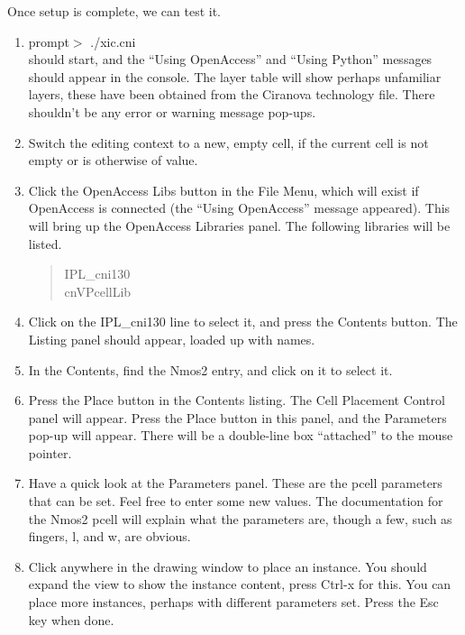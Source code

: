 Once setup is complete, we can test it.
\begin{enumerate}
\item{{\vt prompt$>$  ./xic.cni}\\
{\Xic} should start, and the ``Using OpenAccess'' and ``Using Python''
messages should appear in the console.  The layer table will show
perhaps unfamiliar layers, these have been obtained from the Ciranova
technology file.  There shouldn't be any error or warning message
pop-ups.}

\item{Switch the editing context to a new, empty cell, if the current
cell is not empty or is otherwise of value.}

\item{Click the {\cb OpenAccess Libs} button in the {\cb File Menu},
which will exist if OpenAccess is connected (the ``Using OpenAccess''
message appeared).  This will bring up the {\cb OpenAccess Libraries}
panel.  The following libraries will be listed.
\begin{quote}\vt
IPL\_cni130\\
cnVPcellLib
\end{quote} }

\item{Click on the {\vt IPL\_cni130} line to select it, and press the
{\cb Contents} button.  The {\cb Listing} panel should appear, loaded
up with names.}

\item{In the {\cb Contents}, find the {\et Nmos2} entry, and click on
it to select it.}

\item{Press the {\cb Place} button in the {\cb Contents} listing.  The
{\cb Cell Placement Control} panel will appear.  Press the {\cb Place}
button in this panel, and the {\cb Parameters} pop-up will appear. 
There will be a double-line box ``attached'' to the mouse pointer.}

\item{Have a quick look at the {\cb Parameters} panel.  These are the
pcell parameters that can be set.  Feel free to enter some new values. 
The documentation for the {\vt Nmos2} pcell will explain what the
parameters are, though a few, such as {\vt fingers}, {\vt l}, and {\vt
w}, are obvious.}

\item{Click anywhere in the drawing window to place an instance.  You
should expand the view to show the instance content, press {\kb
Ctrl-x} for this.  You can place more instances, perhaps with
different parameters set.  Press the {\kb Esc} key when done.}


\end{enumerate}

